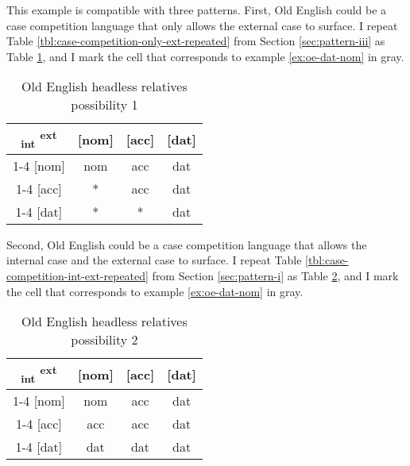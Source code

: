 This example is compatible with three patterns. First, Old English could be a case competition language that only allows the external case to surface. I repeat Table \ref{tbl:case-competition-only-ext-repeated} from Section \ref{sec:pattern-iii} as Table \ref{tbl:oe-poss1}, and I mark the cell that corresponds to example \ref{ex:oe-dat-nom} in gray.

 \begin{table}[ht]
   \center
   \caption{Old English headless relatives possibility 1}
   \begin{tabular}{c|c|c|c}
     \toprule
     \textsubscript{\ac{int}} \textsuperscript{\ac{ext}}
            & [\ac{nom}]
            & [\ac{acc}]
            & [\ac{dat}]
            \\ \cmidrule{1-4}
        [\ac{nom}]
            & \ac{nom}
            & \ac{acc}
            & \cellcolor{LG}\ac{dat}
            \\ \cmidrule{1-4}
        [\ac{acc}]
            & *
            & \ac{acc}
            & \ac{dat}
            \\ \cmidrule{1-4}
        [\ac{dat}]
            & *
            & *
            & \ac{dat}
            \\
      \bottomrule
   \end{tabular}
     \label{tbl:oe-poss1}
 \end{table}

Second, Old English could be a case competition language that allows the internal case and the external case to surface. I repeat Table \ref{tbl:case-competition-int-ext-repeated} from Section \ref{sec:pattern-i} as Table \ref{tbl:oe-poss2}, and I mark the cell that corresponds to example \ref{ex:oe-dat-nom} in gray.

  \begin{table}[ht]
    \center
    \caption{Old English headless relatives possibility 2}
    \begin{tabular}{c|c|c|c}
      \toprule
      \textsubscript{\ac{int}} \textsuperscript{\ac{ext}}
             & [\ac{nom}]
             & [\ac{acc}]
             & [\ac{dat}]
             \\ \cmidrule{1-4}
         [\ac{nom}]
             & \ac{nom}
             & \ac{acc}
             & \cellcolor{LG}\ac{dat}
             \\ \cmidrule{1-4}
         [\ac{acc}]
             & \ac{acc}
             & \ac{acc}
             & \ac{dat}
             \\ \cmidrule{1-4}
         [\ac{dat}]
             & \ac{dat}
             & \ac{dat}
             & \ac{dat}
             \\
       \bottomrule
    \end{tabular}
      \label{tbl:oe-poss2}
  \end{table}

